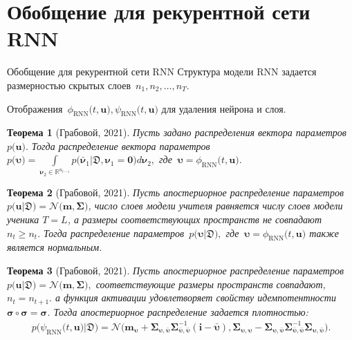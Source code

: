 \documentclass[10pt,pdf,hyperref={unicode}]{beamer}
\newtheorem{rustheorem}{Теорема}
\begin{document}
\section{Обобщение для рекурентной сети RNN}
\justifying
\begin{frame}{Обобщение для рекурентной сети RNN}
Структура модели RNN задается размерностью скрытых слоев~$n_1, n_2, \ldots, n_T.$

Отображения~$\phi_{\text{RNN}}\bigr(t, \mathbf{u}\bigr), \psi_{\text{RNN}}\bigr(t, \mathbf{u}\bigr)$ для удаления нейрона и слоя.

\begin{rustheorem}[Грабовой, 2021]
\justifying
Пусть задано распределения вектора параметров~$p\bigr(\mathbf{u}\bigr).$ Тогда распределение вектора параметров~$p\bigr(\bm{\upsilon}\bigr) = \int\limits_{ \bm{\nu}_2 \in \mathbb{R}^{n_{t-1}}}p\bigr(\bar{\bm{\nu}}_1|\mathfrak{D}, \bm{\nu}_1=\mathbf{0}\bigr) d \bm{\nu}_2,$ где~$\bm{\upsilon} = \phi_{\text{RNN}}\bigr(t, \mathbf{u}\bigr).$
\end{rustheorem}

\begin{rustheorem}[Грабовой, 2021]
\justifying
Пусть апостериорное распределение параметров  $p\bigr(\mathbf{u}|\mathfrak{D}\bigr) = \mathcal{N}\bigr(\mathbf{m}, \bm{\Sigma}\bigr)$, число слоев модели учителя равняется числу слоев модели ученика $T=L$, а размеры соответствующих пространств не совпадают~$n_t \geq n_t.$
Тогда распределение параметров~$p\bigr(\bm{\upsilon}|\mathfrak{D}\bigr),$ где~$\bm{\upsilon} = \phi_{\text{RNN}}\bigr(t, \mathbf{u}\bigr)$ также является нормальным.
\end{rustheorem}

\begin{rustheorem}[Грабовой, 2021]
\justifying
Пусть апостериорное распределение параметров $p\bigr(\mathbf{u}|\mathfrak{D}\bigr) = \mathcal{N}\bigr(\mathbf{m}, \bm{\Sigma}\bigr),$ соответствующие размеры пространств совпадают, $n_t=n_{t+1}.$ а функция активации удовлетворяет свойству идемпотентности $\bm{\sigma} \circ \bm{\sigma} = \bm{\sigma}$.
Тогда апостериорное распределение задается плотностью:
\[
\label{eq:ap:5}
\begin{aligned}
p\bigr(\psi_{\text{RNN}}\bigr(t, \mathbf{u}\bigr)|\mathfrak{D}\bigr) = \mathcal{N}\bigr(\mathbf{m}_{\bm{\upsilon}}+\bm{\Sigma}_{\bm{\upsilon},\bar{\bm{\upsilon}}} \bm{\Sigma}_{\bar{\bm{\upsilon}},\bar{\bm{\upsilon}}}^{-1} \left(\mathbf{i} - \bar{\bm{\upsilon}}\right), \bm{\Sigma}_{\bm{\upsilon},\bm{\upsilon}} - \bm{\Sigma}_{\bm{\upsilon},\bar{\bm{\upsilon}}}\bm{\Sigma}_{\bar{\bm{\upsilon}},\bar{\bm{\upsilon}}}^{-1}\bm{\Sigma}_{\bm{\upsilon},\bar{\bm{\upsilon}}}\bigr).
\end{aligned}
\]
\end{rustheorem}

\end{frame}
\end{document}
